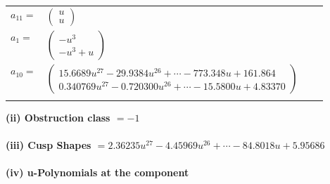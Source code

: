 \documentclass[1p]{elsarticle_modified}
\theoremstyle{definition}
\begin{document}
\begin{tabular}{m{7pt} m{180pt} m{7pt} m{180pt} }
\flushright $a_{11}=$&$\begin{pmatrix}u\\u\end{pmatrix}$ \\
\flushright $a_{1}=$&$\begin{pmatrix}- u^3\\- u^3+u\end{pmatrix}$ \\
\flushright $a_{10}=$&$\begin{pmatrix}15.6689 u^{27}-29.9384 u^{26}+\cdots-773.348 u+161.864\\0.340769 u^{27}-0.720300 u^{26}+\cdots-15.5800 u+4.83370\end{pmatrix}$\\&\end{tabular}
\flushleft \textbf{(ii) Obstruction class $= -1$}\\~\\
\flushleft \textbf{(iii) Cusp Shapes $= 2.36235 u^{27}-4.45969 u^{26}+\cdots-84.8018 u+5.95686$}\\~\\
\newpage\renewcommand{\arraystretch}{1}
\flushleft \textbf{(iv) u-Polynomials at the component}\newline \\
\end{document}
